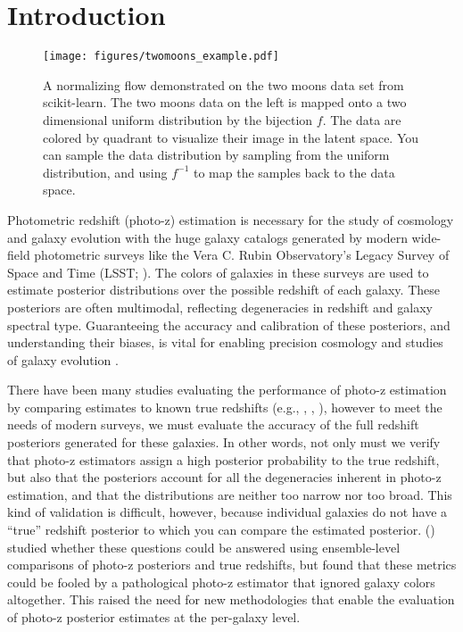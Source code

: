 \documentclass[twocolumn,twocolappendix]{aastex631}
\newcommand{\citePZt}{\citetalias{schmidt2020} (\citeyear{schmidt2020})\xspace}
\begin{document}
\section{Introduction}
\label{sec:intro}

\begin{figure*}[t]
    \begin{centering}
        \texttt{[image: figures/twomoons\_example.pdf]}
        \caption{
            A normalizing flow demonstrated on the two moons data set from scikit-learn.
            The two moons data on the left is mapped onto a two dimensional uniform distribution by the bijection $f$.
            The data are colored by quadrant to visualize their image in the latent space.
            You can sample the data distribution by sampling from the uniform distribution, and using $f^{-1}$ to map the samples back to the data space.
        }
        \label{fig:two-moons}
    \end{centering}
\end{figure*}

Photometric redshift (photo-z) estimation is necessary for the study of cosmology and galaxy evolution with the huge galaxy catalogs generated by modern wide-field photometric surveys like the Vera C. Rubin Observatory's Legacy Survey of Space and Time (LSST; \citealt{ivezic2019}).
The colors of galaxies in these surveys are used to estimate posterior distributions over the possible redshift of each galaxy.
These posteriors are often multimodal, reflecting degeneracies in redshift and galaxy spectral type.
Guaranteeing the accuracy and calibration of these posteriors, and understanding their biases, is vital for enabling precision cosmology and studies of galaxy evolution \citep{newman2022,descSRD}.

There have been many studies evaluating the performance of photo-z estimation by comparing estimates to known true redshifts (e.g., \citealt{hildebrandt2010}, \citealt{sanchez2014}, \citealt{graham2018}), however to meet the needs of modern surveys, we must evaluate the accuracy of the full redshift posteriors generated for these galaxies.
In other words, not only must we verify that photo-z estimators assign a high posterior probability to the true redshift, but also that the posteriors account for all the degeneracies inherent in photo-z estimation, and that the distributions are neither too narrow nor too broad.
This kind of validation is difficult, however, because individual galaxies do not have a ``true'' redshift posterior to which you can compare the estimated posterior.
\citePZt studied whether these questions could be answered using ensemble-level comparisons of photo-z posteriors and true redshifts, but found that these metrics could be fooled by a pathological photo-z estimator that ignored galaxy colors altogether.
This raised the need for new methodologies that enable the evaluation of photo-z posterior estimates at the per-galaxy level.
\end{document}
